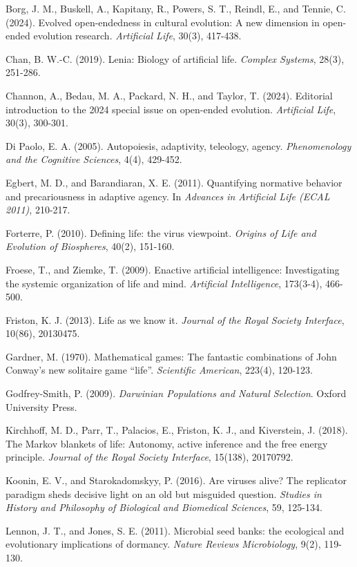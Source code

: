 \documentclass[Afour,sageh,times,doublespace]{sagej}
\begin{document}
Borg, J. M., Buskell, A., Kapitany, R., Powers, S. T., Reindl, E., and Tennie, C. (2024). Evolved open-endedness in cultural evolution: A new dimension in open-ended evolution research. \emph{Artificial Life}, 30(3), 417-438.

Chan, B. W.-C. (2019). Lenia: Biology of artificial life. \emph{Complex Systems}, 28(3), 251-286.

Channon, A., Bedau, M. A., Packard, N. H., and Taylor, T. (2024). Editorial introduction to the 2024 special issue on open-ended evolution. \emph{Artificial Life}, 30(3), 300-301.

Di Paolo, E. A. (2005). Autopoiesis, adaptivity, teleology, agency. \emph{Phenomenology and the Cognitive Sciences}, 4(4), 429-452.

Egbert, M. D., and Barandiaran, X. E. (2011). Quantifying normative behavior and precariousness in adaptive agency. In \emph{Advances in Artificial Life (ECAL 2011)}, 210-217.

Forterre, P. (2010). Defining life: the virus viewpoint. \emph{Origins of Life and Evolution of Biospheres}, 40(2), 151-160.

Froese, T., and Ziemke, T. (2009). Enactive artificial intelligence: Investigating the systemic organization of life and mind. \emph{Artificial Intelligence}, 173(3-4), 466-500.

Friston, K. J. (2013). Life as we know it. \emph{Journal of the Royal Society Interface}, 10(86), 20130475.

Gardner, M. (1970). Mathematical games: The fantastic combinations of John Conway's new solitaire game ``life''. \emph{Scientific American}, 223(4), 120-123.

Godfrey-Smith, P. (2009). \emph{Darwinian Populations and Natural Selection}. Oxford University Press.

Kirchhoff, M. D., Parr, T., Palacios, E., Friston, K. J., and Kiverstein, J. (2018). The Markov blankets of life: Autonomy, active inference and the free energy principle. \emph{Journal of the Royal Society Interface}, 15(138), 20170792.

Koonin, E. V., and Starokadomskyy, P. (2016). Are viruses alive? The replicator paradigm sheds decisive light on an old but misguided question. \emph{Studies in History and Philosophy of Biological and Biomedical Sciences}, 59, 125-134.

Lennon, J. T., and Jones, S. E. (2011). Microbial seed banks: the ecological and evolutionary implications of dormancy. \emph{Nature Reviews Microbiology}, 9(2), 119-130.
\end{document}
